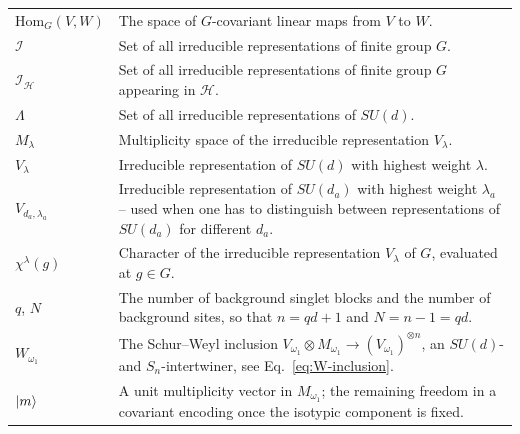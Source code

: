 \documentclass[10pt,twocolumn,superscriptaddress,aps,amsmath,amssymb,citeautoscript,floatfix,prx]{revtex4-2}
\theoremstyle{plain}
\theoremstyle{plain}
\theoremstyle{plain}
\theoremstyle{plain}
\theoremstyle{plain}
\theoremstyle{plain}
\newcommand{\Hom}{\mathrm{Hom}}
\theoremstyle{plain}
\theoremstyle{definition}
\theoremstyle{plain}
\begin{document}
\begin{appendix}
\begin{tabular}{@{}ll@{}}
\parbox[t]{0.22\textwidth}{$\Hom_G(V, W)$} & \parbox[t]{0.72\textwidth}{The space of $G$-covariant linear maps from $V$ to $W$.} \\[0.6em]

\parbox[t]{0.22\textwidth}{$\mathcal{I}$} & \parbox[t]{0.72\textwidth}{Set of all irreducible representations of finite group $G$.} \\[0.6em]

\parbox[t]{0.22\textwidth}{$\mathcal{I}_{\mathcal{H}}$} & \parbox[t]{0.72\textwidth}{Set of all irreducible representations of finite group $G$ appearing in $\mathcal{H}$.} \\[0.6em]

\parbox[t]{0.22\textwidth}{$\Lambda$} & \parbox[t]{0.72\textwidth}{Set of all irreducible representations of $SU(d)$.} \\[0.6em]

\parbox[t]{0.22\textwidth}{$M_{\lambda}$} & \parbox[t]{0.72\textwidth}{Multiplicity space of the irreducible representation $V_{\lambda}$.} \\[0.6em]

\parbox[t]{0.22\textwidth}{$V_{\lambda}$} & \parbox[t]{0.72\textwidth}{Irreducible representation of $SU(d)$ with highest weight $\lambda$.} \\[0.6em]

\parbox[t]{0.22\textwidth}{$V_{d_{a},\lambda_a}$} & \parbox[t]{0.72\textwidth}{Irreducible representation of $SU(d_a)$ with highest weight $\lambda_a$ -- used when one has to distinguish between representations of $SU(d_a)$ for different $d_a$.} \\[0.6em]

\parbox[t]{0.22\textwidth}{$\chi^{\lambda}(g)$} & \parbox[t]{0.72\textwidth}{Character of the irreducible representation $V_{\lambda}$ of $G$, evaluated at $g \in G$.} \\[0.6em]

\parbox[t]{0.22\textwidth}{$q$, $N$} & \parbox[t]{0.72\textwidth}{The number of background singlet blocks and the number of background sites, so that $n=qd+1$ and $N=n-1=qd$.} \\[0.6em]

\parbox[t]{0.22\textwidth}{$W_{\omega_1}$} & \parbox[t]{0.72\textwidth}{The Schur--Weyl inclusion $V_{\omega_1}\otimes M_{\omega_1}\to(V_{\omega_1})^{\otimes n}$, an $SU(d)$- and $S_n$-intertwiner, see Eq.~\eqref{eq:W-inclusion}.} \\[0.6em]

\parbox[t]{0.22\textwidth}{$\ket m$} & \parbox[t]{0.72\textwidth}{A unit multiplicity vector in $M_{\omega_1}$; the remaining freedom in a covariant encoding once the isotypic component is fixed.} \\[0.6em]


\end{tabular}
\end{appendix}
\end{document}

